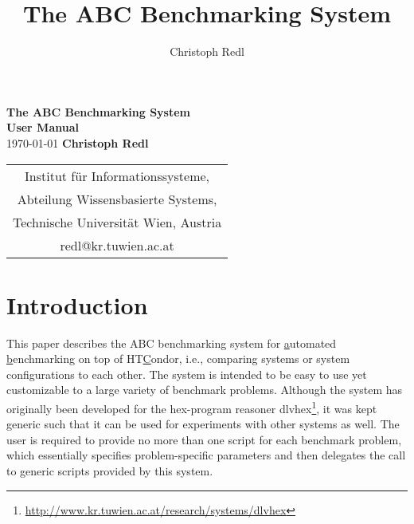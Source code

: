 \documentclass[a4paper]{article}
\newcommand{\dlvhex}{{\sc dlvhex}}
\newcommand{\hex}{{\sc hex}}
\newcommand{\abcs}{{ABC}}
\begin{document}
	
	\title{The \abcs{} Benchmarking System}
	\author{Christoph Redl}


\begin{titlepage}
    \centering
    \vfill
    \vskip2cm
        {\bfseries\Huge The \abcs{} Benchmarking System} \\[1em]
        {\bfseries\Huge User Manual} \\
        \vskip3.0cm
        \medskip
        {\Large \today}        
        \vskip2cm
        {\bfseries\Large
        Christoph Redl \\
        }    
        \vspace{1cm}
        \begin{tabular}{c}
        {\Large}
          Institut f\"ur Informationssysteme,\\
          Abteilung Wissensbasierte Systems,\\
          Technische Universit\"at Wien, Austria \\
          {redl@kr.tuwien.ac.at} \\[1ex]
        \end{tabular}
        \vspace{4cm}
	\restoregeometry
\end{titlepage}
	
	\section{Introduction}
	\label{sec:introduction}

		This paper describes the \abcs{} benchmarking system
		for \uline{a}utomated \uline{b}enchmarking on top of HT\uline{C}ondor, i.e.,
		comparing systems or system configurations to each other.
		The system is intended to be easy to use yet customizable to a large variety of
		benchmark problems.
		Although the system has originally been developed for the \hex-program reasoner \dlvhex{}\footnote{\url{http://www.kr.tuwien.ac.at/research/systems/dlvhex}},
		it was kept generic such that it can be used for experiments with other systems as well.
		The user is required to provide no more than one script for each benchmark problem,
		which essentially specifies problem-specific parameters and then delegates the call
		to generic scripts provided by this system.
		
\end{document}
